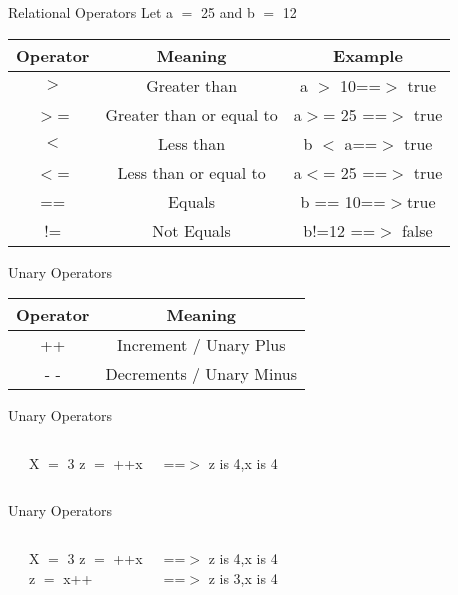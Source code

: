 \documentclass[aspectratio=169,14pt,usenames,dvipsnames]{beamer}
\begin{document}
\begin{frame}{Relational Operators}
Let a $ = $ 25 and b $ = $ 12
\begin{tabular}{|c|c|c|}
\hline 
\textbf{Operator} & \textbf{Meaning} & \textbf{Example}\\
\hline
$>$ & Greater than & a $>$ 10==$>$ true\\
\hline
 $>$= & Greater than or equal to & a$>$= 25  ==$>$  true\\
\hline
$<$ & Less than & b $<$ a==$>$ true\\
 \hline
$<$= & Less than or equal to & a$<$= 25  ==$>$  true\\
 \hline
== & Equals & b == 10==$>$true\\
\hline
!= & Not Equals & b!=12 ==$>$ false\\
\hline
\end{tabular}
\end{frame}

\begin{frame}{Unary Operators}
\begin{tabular}{|c|c|}
\hline
\textbf{Operator} & \textbf{Meaning} \\
\hline
++ & Increment / Unary Plus\\
\hline
- - & Decrements / Unary Minus\\
\hline
\end{tabular}
\end{frame}

\begin{frame}{Unary Operators}
\begin{columns}
\\
\begin{block}{X $=$ 3}
z $=$ ++x

\end{block}
==$>$ z is 4,x is 4

\end{columns}
\end{frame}

\begin{frame}{Unary Operators}
\begin{columns}
\\
\begin{block}{X $=$ 3}
z $=$ ++x\\
z $=$ x++\\
\end{block}
==$>$ z is 4,x is 4\\
==$>$ z is 3,x is 4\\
\end{columns}
\end{frame}
\end{document}
